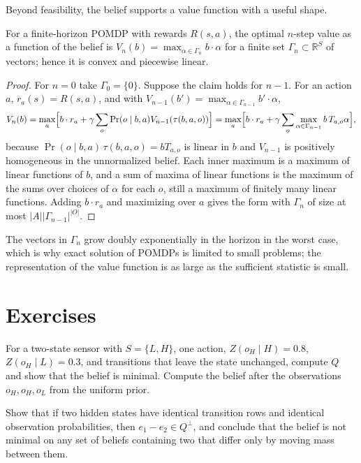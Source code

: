 Beyond feasibility, the belief supports a value function with a useful shape.

\begin{established}\label{thm:alpha}
For a finite-horizon POMDP with rewards $R(s,a)$, the optimal $n$-step value as a function of the belief is $V_n(b)=\max_{\alpha\in\Gamma_n}b\cdot\alpha$ for a finite set $\Gamma_n\subset\mathbb R^S$ of vectors; hence it is convex and piecewise linear.
\end{established}
\begin{proof}
For $n=0$ take $\Gamma_0=\{0\}$. Suppose the claim holds for $n-1$. For an action $a$, $r_a(s)=R(s,a)$, and with $V_{n-1}(b')=\max_{\alpha\in\Gamma_{n-1}}b'\cdot\alpha$,
\[
V_n(b)=\max_a\Bigl[b\cdot r_a+\gamma\sum_o\Pr(o\mid b,a)V_{n-1}(\tau(b,a,o))\Bigr]
=\max_a\Bigl[b\cdot r_a+\gamma\sum_o\max_{\alpha\in\Gamma_{n-1}}b\,T_{a,o}\alpha\Bigr],
\]
because $\Pr(o\mid b,a)\,\tau(b,a,o)=bT_{a,o}$ is linear in $b$ and $V_{n-1}$ is positively homogeneous in the unnormalized belief. Each inner maximum is a maximum of linear functions of $b$, and a sum of maxima of linear functions is the maximum of the sums over choices of $\alpha$ for each $o$, still a maximum of finitely many linear functions. Adding $b\cdot r_a$ and maximizing over $a$ gives the form with $\Gamma_n$ of size at most $|A||\Gamma_{n-1}|^{|O|}$.
\end{proof}

The vectors in $\Gamma_n$ grow doubly exponentially in the horizon in the worst case, which is why exact solution of POMDPs is limited to small problems; the representation of the value function is as large as the sufficient statistic is small.

\section*{Exercises}

\begin{exercise}
For a two-state sensor with $S=\{L,H\}$, one action, $Z(o_H\mid H)=0.8$, $Z(o_H\mid L)=0.3$, and transitions that leave the state unchanged, compute $Q$ and show that the belief is minimal. Compute the belief after the observations $o_H,o_H,o_L$ from the uniform prior.\label{ex2:sensor}
\end{exercise}

\begin{exercise}
Show that if two hidden states have identical transition rows and identical observation probabilities, then $e_1-e_2\in Q^{\perp}$, and conclude that the belief is not minimal on any set of beliefs containing two that differ only by moving mass between them.\label{ex2:identical-rows}
\end{exercise}

